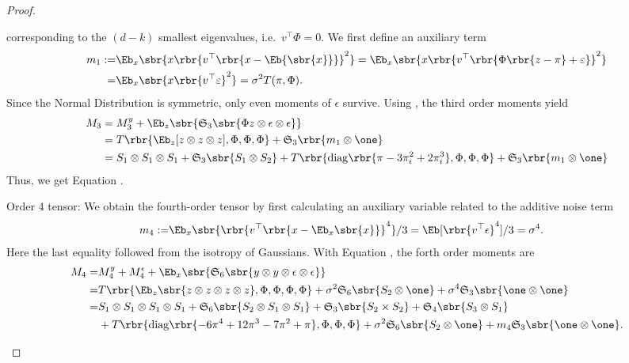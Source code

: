 \documentclass[twoside,11pt]{article}
\newcommand{\symm}{\mathfrak{S}}
\begin{document}
{\begin{proof}
\begin{description*}
  corresponding to the $(d-k)$ smallest eigenvalues, i.e.\ $v^\top \Phi=
  0$. We first define an auxiliary term
  \begin{align}
    \nonumber
    m_1 :=& \Eb_x \sbr{x \rbr{v^\top \rbr{x-\Eb{\sbr{x}}}}^2} =  \Eb_x
    \sbr{x\rbr{v^\top \rbr{\Phi\rbr{z-\pi}+\varepsilon}}^2} \\
    =& \Eb_x\sbr{x\rbr{v^\top \varepsilon}^2} = \sigma^2 T(\pi, \Phi). 
  \end{align}
  Since the Normal Distribution is symmetric, only even moments of
  $\epsilon$ survive. Using , the third order moments yield
  \begin{align}
    M_3 & =    M_3^y  + \Eb_z \sbr{\symm_3 \sbr{\Phi z \otimes \epsilon \otimes \epsilon} }\\
    & = T\rbr{\Eb_z[z\otimes z \otimes z],\Phi,\Phi,\Phi} 
       + \symm_3 \rbr{m_1\otimes \one } \\
    &=S_1 \otimes S_1 \otimes S_1 +\symm_3 \sbr{ S_1 \otimes S_2}
    +T\rbr{ \mathrm{diag}\rbr{\pi - 3\pi_i^2+2\pi_i^3},\Phi,\Phi,\Phi}
    + \symm_3\rbr{m_1\otimes \one } 
    \nonumber
\end{align}
Thus, we get Equation .
\item[Order 4 tensor:] We obtain the fourth-order tensor by first
  calculating an auxiliary variable related to the additive noise term
\begin{align}
m_4 :=& \Eb_x \sbr{\rbr{v^\top \rbr{x-\Eb_x\sbr{x}}}^4}/3 =  \Eb[\rbr{v^\top \epsilon}^4]/3=   \sigma^4.
\end{align}
Here the last equality followed from the isotropy of Gaussians. 
With Equation , the forth order moments are
\begin{align}
  \nonumber
M_4 =& M_4^y + M_4^\epsilon + \Eb_x \sbr{\symm_6 \sbr{y \otimes y \otimes \epsilon \otimes \epsilon} }\\ 
       =& T\rbr{ \Eb_z \sbr{z \otimes z \otimes z \otimes z}, \Phi, \Phi,\Phi,\Phi}
         +\sigma^2 \symm_6\sbr{S_2 \otimes \one} 
         +  \sigma^4 \symm_3 \sbr{\one\otimes \one} \nonumber\\
       =& S_1 \otimes S_1 \otimes S_1 \otimes S_1 \nonumber 
         + \symm_6 \sbr{S_2 \otimes S_1 \otimes S_1} 
         + \symm_3 \sbr{S_2 \times S_2} \nonumber 
         + \symm_4 \sbr{S_3 \otimes S_1} \\
      & +T\rbr{ \mathrm{diag}\rbr{-6 \pi^4 +12 \pi^3 -7 \pi^2 + \pi}, \Phi, \Phi, \Phi}  
         + \sigma^2\symm_6\sbr{S_2 \otimes \one} 
         +   m_4 \symm_3 \sbr{\one\otimes \one}.  \nonumber
\end{align}


\end{description*}
\end{proof}}
\end{document}

